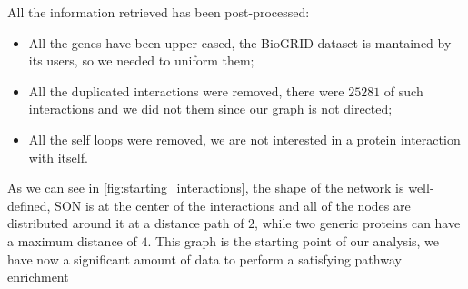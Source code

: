 All the information retrieved has been post-processed:
\begin{itemize}
    \item All the genes have been upper cased, the BioGRID dataset is mantained by its users, so we needed to uniform them;
    \item All the duplicated interactions were removed, there were $25281$ of such interactions and we did not them since our graph is not directed;
    \item All the self loops were removed, we are not interested in a protein interaction with itself.
\end{itemize}
As we can see in \autoref{fig:starting_interactions}, the shape of the network is well-defined, SON is at the center of the interactions and all of the nodes are distributed around it at a distance path of $2$, while two generic proteins can have a maximum distance of $4$. This graph is the starting point of our analysis, we have now a significant amount of data to perform a satisfying pathway enrichment 